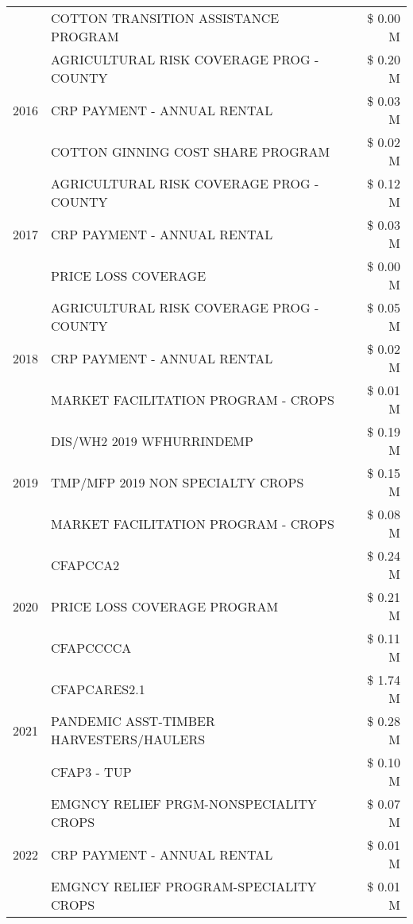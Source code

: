 \begin{tabular}{llr}
 & COTTON TRANSITION ASSISTANCE PROGRAM & \$ 0.00 M \\
\cline{1-3}
\multirow[t]{3}{*}{2016} & AGRICULTURAL RISK COVERAGE PROG - COUNTY & \$ 0.20 M \\
 & CRP PAYMENT - ANNUAL RENTAL & \$ 0.03 M \\
 & COTTON GINNING COST SHARE PROGRAM & \$ 0.02 M \\
\cline{1-3}
\multirow[t]{3}{*}{2017} & AGRICULTURAL RISK COVERAGE PROG - COUNTY & \$ 0.12 M \\
 & CRP PAYMENT - ANNUAL RENTAL & \$ 0.03 M \\
 & PRICE LOSS COVERAGE & \$ 0.00 M \\
\cline{1-3}
\multirow[t]{3}{*}{2018} & AGRICULTURAL RISK COVERAGE PROG - COUNTY & \$ 0.05 M \\
 & CRP PAYMENT - ANNUAL RENTAL & \$ 0.02 M \\
 & MARKET FACILITATION PROGRAM - CROPS & \$ 0.01 M \\
\cline{1-3}
\multirow[t]{3}{*}{2019} & DIS/WH2 2019 WFHURRINDEMP & \$ 0.19 M \\
 & TMP/MFP 2019 NON SPECIALTY CROPS & \$ 0.15 M \\
 & MARKET FACILITATION PROGRAM - CROPS & \$ 0.08 M \\
\cline{1-3}
\multirow[t]{3}{*}{2020} & CFAPCCA2 & \$ 0.24 M \\
 & PRICE LOSS COVERAGE PROGRAM & \$ 0.21 M \\
 & CFAPCCCCA & \$ 0.11 M \\
\cline{1-3}
\multirow[t]{3}{*}{2021} & CFAPCARES2.1 & \$ 1.74 M \\
 & PANDEMIC ASST-TIMBER HARVESTERS/HAULERS & \$ 0.28 M \\
 & CFAP3 - TUP & \$ 0.10 M \\
\cline{1-3}
\multirow[t]{3}{*}{2022} & EMGNCY RELIEF PRGM-NONSPECIALITY CROPS & \$ 0.07 M \\
 & CRP PAYMENT - ANNUAL RENTAL & \$ 0.01 M \\
 & EMGNCY RELIEF PROGRAM-SPECIALITY CROPS & \$ 0.01 M \\
\cline{1-3}
\bottomrule
\end{tabular}

